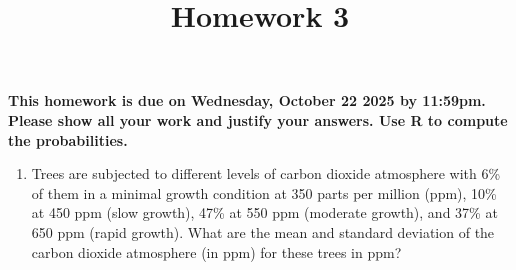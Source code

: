 \documentclass[
]{article}
\title{Homework 3}
\author{}
\date{\vspace{-2.5em}}
\providecommand{\tightlist}{%
  \setlength{\itemsep}{0pt}\setlength{\parskip}{0pt}}
\begin{document}
\maketitle

\textbf{This homework is due on Wednesday, October 22 2025 by 11:59pm.
Please show all your work and justify your answers. Use R to compute the
probabilities.}

\begin{enumerate}
\def\labelenumi{\arabic{enumi}.}
\tightlist
\item
  Trees are subjected to different levels of carbon dioxide atmosphere
  with 6\% of them in a minimal growth condition at 350 parts per
  million (ppm), 10\% at 450 ppm (slow growth), 47\% at 550 ppm
  (moderate growth), and 37\% at 650 ppm (rapid growth). What are the
  mean and standard deviation of the carbon dioxide atmosphere (in ppm)
  for these trees in ppm?
\end{enumerate}
\end{document}

